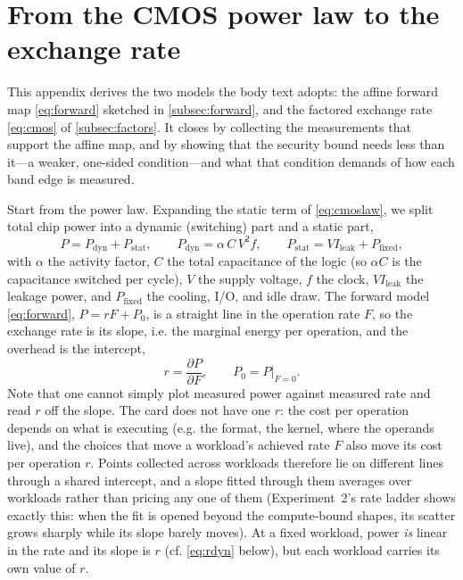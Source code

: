 \documentclass{article}
\theoremstyle{plain}
\theoremstyle{definition}
\theoremstyle{remark}
\begin{document}



\newpage
\appendix
\onecolumn

\section{From the CMOS power law to the exchange rate}
\label{app:cmos}

This appendix derives the two models the body text adopts: the affine
forward map \cref{eq:forward} sketched in \cref{subsec:forward}, and the
factored exchange rate \cref{eq:cmos} of \cref{subsec:factors}. It closes
by collecting the measurements that support the affine map, and by showing
that the security bound needs less than it---a weaker, one-sided
condition---and what that condition demands of how each band edge is
measured.

Start from the power law. Expanding the
static term of \cref{eq:cmoslaw}, we split total chip power into a dynamic
(switching) part and a static part,
\begin{equation}
	P = P_{\mathrm{dyn}} + P_{\mathrm{stat}}, \qquad
	P_{\mathrm{dyn}} = \alpha\, C\, V^2 f, \qquad
	P_{\mathrm{stat}} = V I_{\mathrm{leak}} + P_{\mathrm{fixed}},
	\label{eq:powertotal}
\end{equation}
with $\alpha$ the activity factor, $C$ the total capacitance of the logic
(so $\alpha C$ is the capacitance switched per cycle), $V$ the
supply voltage, $f$ the clock, $V I_{\mathrm{leak}}$ the leakage power, and
$P_{\mathrm{fixed}}$ the cooling, I/O, and idle draw. The forward model
\cref{eq:forward}, $P = rF + P_0$, is a straight line in the operation rate $F$,
so the exchange rate is its slope, i.e. the marginal energy per operation, and the overhead
is the intercept,
\begin{equation}
	r = \frac{\partial P}{\partial F}, \qquad P_0 = P\big|_{F=0}.
	\label{eq:marginal}
\end{equation}
Note that one cannot simply plot measured power
against measured rate and read $r$ off the slope. The card does not have one
$r$: the cost per operation depends on what is executing (e.g. the format, the
kernel, where the operands live), and the choices that move a workload's
achieved rate $F$ also move its cost per operation $r$. Points collected across
workloads therefore lie on different lines through a shared intercept, and a
slope fitted through them averages over workloads rather than pricing any one
of them (Experiment~2's rate ladder shows exactly this: when the fit is opened beyond
the compute-bound shapes, its scatter grows sharply while its slope barely
moves). At a fixed workload, power \emph{is} linear in the rate and its slope
is $r$ (cf. \cref{eq:rdyn} below), but each workload carries its own value of $r$.
\end{document}
